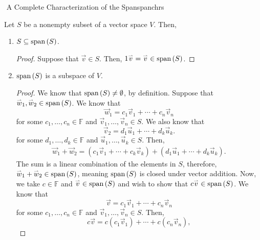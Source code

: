         \begin{theorem}{\Stop\,\,A Complete Characterization of the Span}{spanchrs}
            
            Let \(S\) be a nonempty subset of a vector space \(V\). Then,
            \begin{enumerate}
                \item \(S\subseteq \text{span\,}(S)\).
                \begin{proof}
                    Suppose that \(\vec{v}\in S\). Then, \(1\overset{_{\rightharpoonup}}{v}=\overset{_{\rightharpoonup}}{v}\in\text{span\,}(S)\).
                \end{proof}
                \item \(\text{span\,}(S)\) is a subspace of \(V\).
                \begin{proof}
                    We know that \(\text{span\,}(S)\neq\emptyset\), by definition. Suppose that \(\overset{_{\rightharpoonup}}{w}_1,\overset{_{\rightharpoonup}}{w}_2\in \text{span\,}(S)\). We know that 
                    \begin{equation*}
                        \vec{w}_1=c_1\vec{v}_1+\cdots+c_n\vec{v}_n
                    \end{equation*} 
                    for some \(c_1,\ldots,c_n\in\mathbb{F}\) and \(\vec{v}_1,\ldots,\vec{v}_n\in S\). We also know that
                    \begin{equation*}
                        \vec{v}_2=d_1\vec{u}_1+\cdots+d_k\vec{u}_k.
                    \end{equation*}
                    for some \(d_1,\ldots,d_k\in\mathbb{F}\) and \(\vec{u}_1,\ldots,\vec{u}_k\in S\). Then,
                    \begin{align*}
                        \vec{w}_1+\vec{w}_2=(c_1\vec{v}_1+\cdots+c_k\vec{v}_k)+(d_1\vec{u}_1+\cdots+d_k\vec{u}_k).
                    \end{align*}
                    The sum is a linear combination of the elements in \(S\), therefore, \(\overset{_{\rightharpoonup}}{w}_1+\overset{_{\rightharpoonup}}{w}_2\in\text{span\,}(S)\), meaning \(\text{span\,}(S)\) is closed under vector addition. Now, we take \(c\in\mathbb{F}\) and \(\overset{_{\rightharpoonup}}{v}\in\text{span\,}(S)\) and wish to show that \(c\overset{_{\rightharpoonup}}{v}\in\text{span\,}(S)\). We know that
                    \begin{equation*}
                        \vec{v}=c_1\vec{v}_1+\cdots+c_n\vec{v}_n
                    \end{equation*}
                    for some \(c_1,\ldots,c_n\in\mathbb{F}\) and \(\vec{v}_1,\ldots,\vec{v}_n\in S\). Then,
                    \begin{equation*}
                        c\vec{v}=c(c_1\vec{v}_1)+\cdots+c(c_n\vec{v}_n),

\end{equation*}
\end{proof}
\end{enumerate}
\end{theorem}

